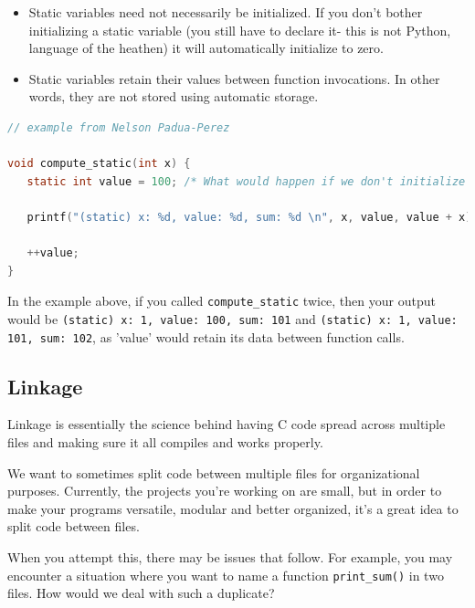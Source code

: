 \documentclass[english, 10pt]{article}
\begin{document}
\begin{itemize}
	\item Static variables need not necessarily be initialized. If you don't bother initializing a static variable (you still have to declare it- this is not Python, language of the heathen) it will automatically initialize to zero.
	\item Static variables retain their values between function invocations. In other words, they are not stored using automatic storage.
\end{itemize}

{\centering
\begin{lstlisting}[language=C]
// example from Nelson Padua-Perez

void compute_static(int x) {                                                    
   static int value = 100; /* What would happen if we don't initialize it? */         
                                                                                
   printf("(static) x: %d, value: %d, sum: %d \n", x, value, value + x);        
                                                                                
   ++value;                                                                     
} 
\end{lstlisting}
}

In the example above, if you called \texttt{compute\_static} twice, then your output would be \texttt{(static) x: 1, value: 100, sum: 101} and \texttt{(static) x: 1, value: 101, sum: 102}, as 'value' would retain its data between function calls.

\subsection{Linkage}

Linkage is essentially the science behind having C code spread across multiple files and making sure it all compiles and works properly.\newline

We want to sometimes split code between multiple files for organizational purposes. Currently, the projects you're working on are small, but in order to make your programs versatile, modular and better organized, it's a great idea to split code between files.\newline

When you attempt this, there may be issues that follow. For example, you may encounter a situation where you want to name a function \texttt{print\_sum()} in two files. How would we deal with such a duplicate?\newline
\end{document}
